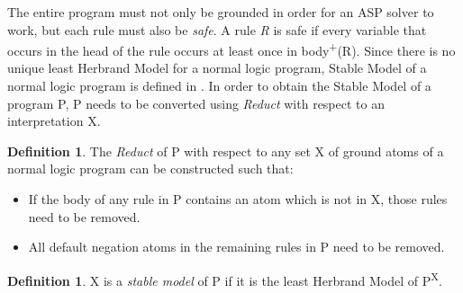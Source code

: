 \documentclass[11pt,twoside]{report}
\theoremstyle{plain}
\theoremstyle{definition}
\newtheorem{defn}[thm]{Definition} %
\begin{document}
The entire program must not only be grounded in order for an ASP solver to work, but each rule must also be \textit{safe}. 
A rule \textit{R} is safe if every variable that occurs in the head of the rule occurs at least once in body\textsuperscript{+}(R).
Since there is no unique least Herbrand Model for a normal logic program, Stable Model of a normal logic program is defined in \cite{Gelfond1988}. 
In order to obtain the Stable Model of a program P, P needs to be converted using \textit{Reduct} with respect to an interpretation X.

\begin{defn}
The \textit{Reduct} of P with respect to any set X of ground atoms of a normal logic program can be constructed such that:
\begin{itemize}
\item If the body of any rule in P contains an atom which is not in X, those rules need to be removed.
\item All default negation atoms in the remaining rules in P need to be removed.
\end{itemize}
\end{defn}

\begin{defn}
X is a \textit{stable model} of P if it is the least Herbrand Model of P\textsuperscript{X}.
\end{defn}
\end{document}
